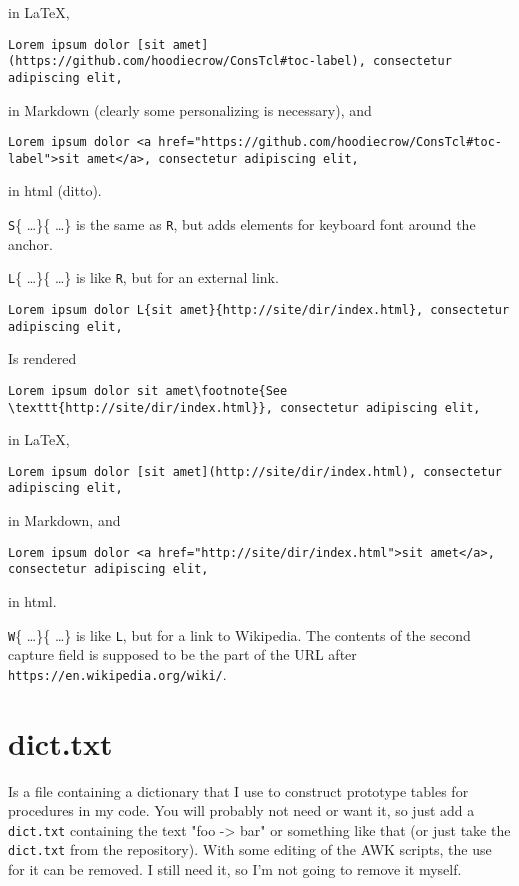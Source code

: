 in \LaTeX{},

\begin{verbatim}
Lorem ipsum dolor [sit amet](https://github.com/hoodiecrow/ConsTcl#toc-label), consectetur adipiscing elit,
\end{verbatim}

in Markdown (clearly some personalizing is necessary), and

\begin{verbatim}
Lorem ipsum dolor <a href="https://github.com/hoodiecrow/ConsTcl#toc-label">sit amet</a>, consectetur adipiscing elit,
\end{verbatim}

in html (ditto).


\texttt{S}\{ \ldots  \}\{ \ldots  \} is the same as \texttt{R}, but adds elements for keyboard font around the anchor.


\texttt{L}\{ \ldots  \}\{ \ldots  \} is like \texttt{R}, but for an external link.

\begin{verbatim}
Lorem ipsum dolor L{sit amet}{http://site/dir/index.html}, consectetur adipiscing elit,
\end{verbatim}

Is rendered

\begin{verbatim}
Lorem ipsum dolor sit amet\footnote{See \texttt{http://site/dir/index.html}}, consectetur adipiscing elit,
\end{verbatim}

in \LaTeX{},

\begin{verbatim}
Lorem ipsum dolor [sit amet](http://site/dir/index.html), consectetur adipiscing elit,
\end{verbatim}

in Markdown, and

\begin{verbatim}
Lorem ipsum dolor <a href="http://site/dir/index.html">sit amet</a>, consectetur adipiscing elit,
\end{verbatim}

in html.


\texttt{W}\{ \ldots  \}\{ \ldots  \} is like \texttt{L}, but for a link to Wikipedia. The contents of the second capture field is supposed to be the part of the URL after \texttt{https://en.wikipedia.org/wiki/}.

\section{dict.txt}
\label{dicttxt}

Is a file containing a dictionary that I use to construct prototype tables for procedures in my code. You will probably not need or want it, so just add a \texttt{dict.txt} containing the text "foo -> bar" or something like that (or just take the \texttt{dict.txt} from the repository). With some editing of the AWK scripts, the use for it can be removed. I still need it, so I'm not going to remove it myself.


